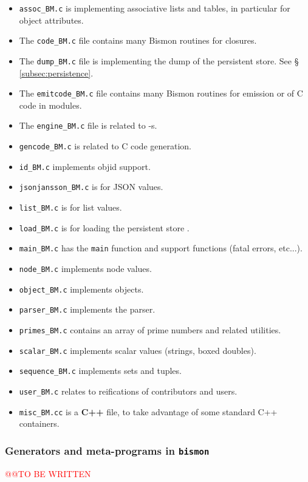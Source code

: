 \begin{itemize}
  \item \texttt{assoc\_BM.c} is implementing associative lists and
    tables,    in
    particular for object attributes.

  \item The \texttt{code\_BM.c} file contains many Bismon routines for
     closures.

  \item The \texttt{dump\_BM.c} file is implementing the  dump of the
      persistent store.   See \S
      \ref{subsec:persistence}.

  \item The \texttt{emitcode\_BM.c} file contains many Bismon routines
    for  emission or  of C code in
     modules.
  \item The \texttt{engine\_BM.c} file is related to -s.

  \item \texttt{gencode\_BM.c} is related to C code generation.

  \item \texttt{id\_BM.c} implements objid support.

  \item \texttt{jsonjansson\_BM.c} is for JSON values.

  \item \texttt{list\_BM.c} is for list values.

  \item \texttt{load\_BM.c} is for loading the persistent store
   .

  \item \texttt{main\_BM.c} has the \texttt{main} function and support functions (fatal errors, etc...).

  \item \texttt{node\_BM.c} implements node values.

  \item \texttt{object\_BM.c} implements objects.

  \item \texttt{parser\_BM.c} implements the parser.

  \item \texttt{primes\_BM.c} contains an array of prime numbers and related utilities.

  \item \texttt{scalar\_BM.c} implements scalar values (strings, boxed doubles).

  \item \texttt{sequence\_BM.c} implements sets and tuples.

  \item \texttt{user\_BM.c} relates to reifications of contributors and
  users.

  \item \texttt{misc\_BM.cc} is a \textbf{C++} file, to take advantage of some standard C++ containers.
\end{itemize}

\subsubsection{Generators and meta-programs in \texttt{bismon}}

{\textcolor{red}{\large @@TO BE WRITTEN}}
